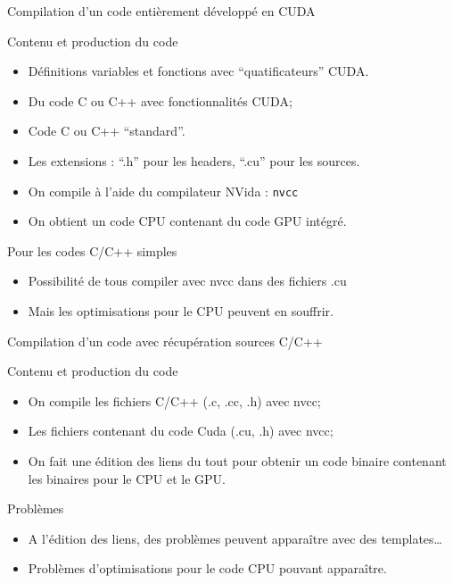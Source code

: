 \documentclass{beamer}
\begin{document}
\begin{frame}{Compilation d'un code entièrement développé en CUDA}

  \begin{exampleblock}{Contenu et production du code}
    \begin{itemize}
    \item Définitions variables et fonctions avec ``quatificateurs''
      CUDA.
    \item Du code C ou C++ avec fonctionnalités CUDA;
    \item Code C ou C++ ``standard''.
    \item Les extensions : ``.h'' pour les headers, ``.cu'' pour les sources.
    \item On compile à l'aide du compilateur NVida : \texttt{nvcc}
    \item On obtient un code CPU contenant du code GPU intégré.
    \end{itemize}
  \end{exampleblock}

  \begin{alertblock}{Pour les codes C/C++ simples}
    \begin{itemize}
    \item Possibilité de tous compiler avec nvcc dans des fichiers .cu
    \item Mais les optimisations pour le CPU peuvent en souffrir.
    \end{itemize}
  \end{alertblock}
\end{frame}

\begin{frame}{Compilation d'un code avec récupération sources C/C++}
  \begin{exampleblock}{Contenu et production du code}
    \begin{itemize}
    \item On compile les fichiers C/C++ (.c, .cc, .h)  avec nvcc;
    \item Les fichiers contenant du code Cuda (.cu, .h) avec nvcc;
    \item On fait une édition des liens du tout pour obtenir un code binaire
      contenant les binaires pour le CPU et le GPU.
    \end{itemize}
  \end{exampleblock}

  \begin{alertblock}{Problèmes}
    \begin{itemize}
  \item A l'édition des liens, des problèmes peuvent apparaître avec des templates\ldots
  \item Problèmes d'optimisations pour le code CPU pouvant apparaître.
    \end{itemize}
  \end{alertblock}
\end{frame}
\end{document}
